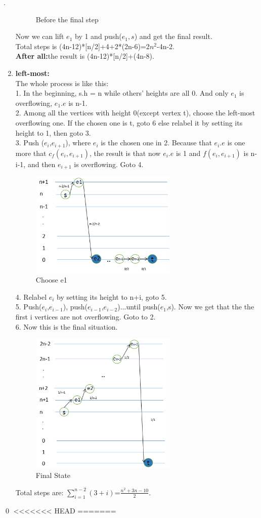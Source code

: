 \documentclass[12pt, notitlepage]{article}
\newenvironment{sol}
  {\par\vspace{3mm}\noindent{\it Solution}.}{\qed}
\begin{document}
\begin{sol}
\begin{enumerate}
\begin{figure}[H]
	\caption{Before the final step}
	\end{figure}
Now we can lift $e_1$ by 1 and push($e_1,s$) and get the final result.\\
Total steps is  (4n-12)*[n/2]+4+2*(2n-6)=2$n^2$-4n-2.\\
\textbf{After all:}the result is (4n-12)*[n/2]+(4n-8).
\item\textbf{left-most:}\\
The whole process is like this:\\
1. In the beginning, s.h = n while others' heights are all 0. And only $e_1$ is overflowing, $e_1.e$ is n-1.\\
2. Among all the vertices with height 0(except vertex t), choose the left-most overflowing one. If the chosen one is t, goto 6 else relabel it by setting its height to 1, then goto 3.\\
3. Push ($e_i$,$e_{i+1}$), where $e_i$ is the chosen one in 2. Because that $e_i.e$ is one more that $c_f(e_i,e_{i+1})$, the result is that now $e_i.e$ is 1 and $f(e_i,e_{i+1})$ is n-i-1, and then $e_{i+1}$ is overflowing. Goto 4.\\
	\begin{figure}[H]\centering
	\includegraphics[width=7cm]{8.png}
	\caption{Choose e1}
	\end{figure}
4. Relabel $e_i$ by setting its height to n+i, goto 5.\\
5. Push($e_i$,$e_{i-1}$), push($e_{i-1}$,$e_{i-2}$)...until push($e_1$,s). Now we get that the the first i vertices are not overflowing. Goto to 2.\\
6. Now this is the final situation.\\
	\begin{figure}[H]\centering
	\includegraphics[width=7cm]{9.png}
	\caption{Final State}
	\end{figure}
Total steps are: $\sum_{i=1}^{n-2}(3+i)$=$\frac{n^2+3n-10}{2}$.
\end{enumerate}
\end{sol}
<<<<<<< HEAD
=======
\end{document}
